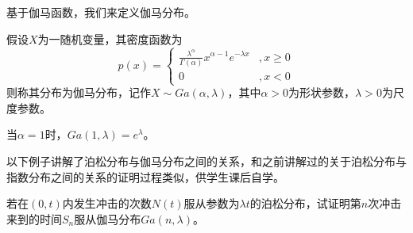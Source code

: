     基于伽马函数，我们来定义伽马分布。
    \begin{definition}\label{def:gamma_distribution}
        假设$X$为一随机变量，其密度函数为
        $$
        p(x)=\left\{\begin{matrix}
    \frac{\lambda ^{\alpha } }{\Gamma (\alpha )}x^{\alpha -1}e^{-\lambda x}  & ,x\ge 0\\
    0&,x<0
    \end{matrix}\right.
        $$
        则称其分布为伽马分布，记作$X\sim Ga(\alpha,\lambda)$，其中$\alpha>0$为形状参数，$\lambda>0$为尺度参数。
    \end{definition}
    \begin{remark}
        当$\alpha = 1$时，$Ga(1,\lambda)=e^{\lambda}$。
    \end{remark}
    以下例子讲解了泊松分布与伽马分布之间的关系，和之前讲解过的关于泊松分布与指数分布之间的关系的证明过程类似，供学生课后自学。
    \begin{example}
        若在$(0,t)$内发生冲击的次数$N(t)$服从参数为$\lambda t$的泊松分布，试证明第$n$次冲击来到的时间$S_{n}$服从伽马分布$Ga(n,\lambda)$。
    \end{example}
